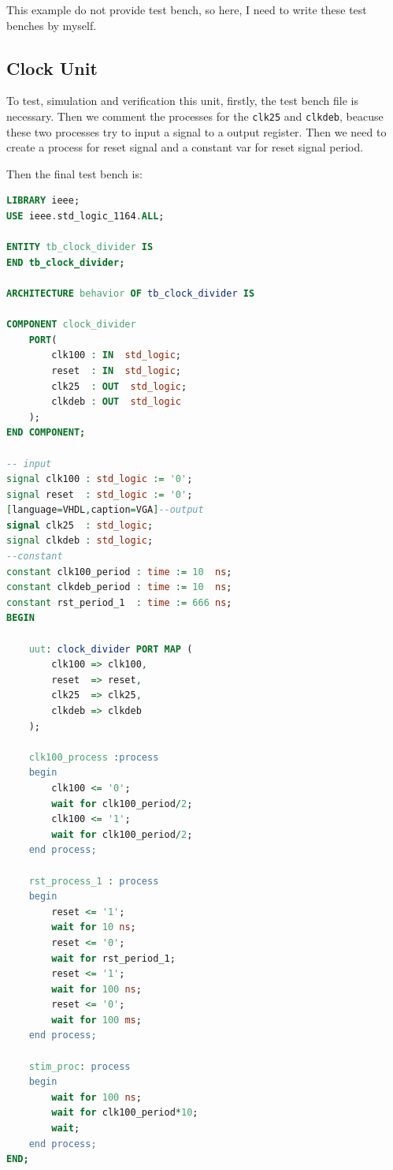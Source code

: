 \documentclass{article}
\begin{document}
    This example do not provide test bench, so here, I need to write these test benches by myself.
    
    \subsection{Clock Unit}
    \label{sec:ps:clockunit}
    
    To test, simulation and verification this unit, firstly, the test bench file is necessary.
    Then we comment the processes for the \verb|clk25| and \verb|clkdeb|, beacuse these two processes
    try to input a signal to a output register.
    Then we need to create a process for reset signal and a constant var for reset signal period.
    
    Then the final test bench is:
    \begin{lstlisting}[language=VHDL,caption=Clock Unit Test Bench]
LIBRARY ieee;
USE ieee.std_logic_1164.ALL;

ENTITY tb_clock_divider IS
END tb_clock_divider;

ARCHITECTURE behavior OF tb_clock_divider IS 

COMPONENT clock_divider
    PORT(
        clk100 : IN  std_logic;
        reset  : IN  std_logic;
        clk25  : OUT  std_logic;
        clkdeb : OUT  std_logic
    );
END COMPONENT;

-- input
signal clk100 : std_logic := '0';
signal reset  : std_logic := '0';
[language=VHDL,caption=VGA]--output
signal clk25  : std_logic;
signal clkdeb : std_logic;
--constant
constant clk100_period : time := 10  ns;
constant clkdeb_period : time := 10  ns;
constant rst_period_1  : time := 666 ns;
BEGIN

    uut: clock_divider PORT MAP (
        clk100 => clk100,
        reset  => reset,
        clk25  => clk25,
        clkdeb => clkdeb
    );

    clk100_process :process
    begin
        clk100 <= '0';
        wait for clk100_period/2;
        clk100 <= '1';
        wait for clk100_period/2;
    end process;

    rst_process_1 : process
    begin
        reset <= '1';
        wait for 10 ns;
        reset <= '0';
        wait for rst_period_1;
        reset <= '1';
        wait for 100 ns;
        reset <= '0';
        wait for 100 ms;
    end process;

    stim_proc: process
    begin	
        wait for 100 ns;	
        wait for clk100_period*10;
        wait;
    end process;
END;
    \end{lstlisting}
        
\end{document}
